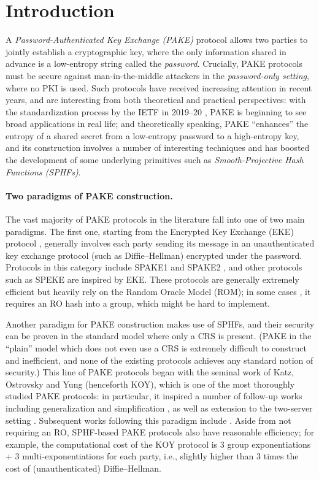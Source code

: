 \section{Introduction}
A \emph{Password-Authenticated Key Exchange (PAKE)} protocol allows two parties to jointly establish a cryptographic key, where the only information shared in advance is a low-entropy string called the \emph{password}. Crucially, PAKE protocols must be secure against man-in-the-middle attackers in the \emph{password-only setting}, where no PKI is used. Such protocols have received increasing attention in recent years, and are interesting from both theoretical and practical perspectives: with the standardization process by the IETF in 2019--20 \cite{pake-selection}, PAKE is beginning to see broad applications in real life; and theoretically speaking, PAKE ``enhances'' the entropy of a shared secret from a low-entropy password to a high-entropy key, and its construction involves a number of interesting techniques and has boosted the development of some underlying primitives such as \emph{Smooth-Projective Hash Functions (SPHFs)}.

\paragraph{Two paradigms of PAKE construction.}
The vast majority of PAKE protocols in the literature fall into one of two main paradigms. The first one, starting from the Encrypted Key Exchange (EKE) protocol \cite{SP:BelMer92}, generally involves each party sending its message in an unauthenticated key exchange protocol (such as Diffie--Hellman) encrypted under the password. Protocols in this category include SPAKE1 and SPAKE2 \cite{RSA:AbdPoi05}, and other protocols such as SPEKE \cite{Jablon97} are inspired by EKE. These protocols are generally extremely efficient but heavily rely on the Random Oracle Model (ROM); in some cases \cite{SP:BelMer92,Jablon97}, it requires an RO hash into a group, which might be hard to implement.

Another paradigm for PAKE construction makes use of SPHFs, and their security can be proven in the standard model where only a CRS is present. (PAKE in the ``plain'' model which does not even use a CRS is extremely difficult to construct and inefficient, and none of the existing protocols \cite{C:GolLin01,TCC:NguVad04,C:GoyJaiOst10} achieves any standard notion of security.) This line of PAKE protocols began with the seminal work of Katz, Ostrovsky and Yung \cite{EC:KatOstYun01} (henceforth KOY), which is one of the most thoroughly studied PAKE protocols: in particular, it inspired a number of follow-up works including generalization \cite{EC:GenLin03} and simplification \cite{TCC:Gennaro08,PKC:AbdBenPoi15}, as well as extension to the two-server setting \cite{ACNS:KMTG05}. Subsequent works following this paradigm include \cite{SAC:JiaGon04,CCS:GroKat10,AC:KatVai09a,TCC:KatVai11}. Aside from not requiring an RO, SPHF-based PAKE protocols also have reasonable efficiency; for example, the computational cost of the KOY protocol is 3 group exponentiations + 3 multi-exponentiations for each party, i.e., slightly higher than 3 times the cost of (unauthenticated) Diffie--Hellman.

